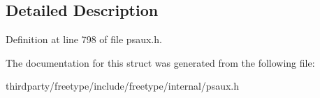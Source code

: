\subsection{Detailed Description}


Definition at line 798 of file psaux.\+h.



The documentation for this struct was generated from the following file\+:\begin{DoxyCompactItemize}
\item 
thirdparty/freetype/include/freetype/internal/psaux.\+h\end{DoxyCompactItemize}
